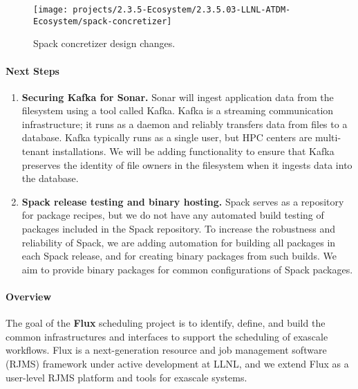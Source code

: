 \begin{figure}[htb]
    \centering
    \texttt{[image: projects/2.3.5-Ecosystem/2.3.5.03-LLNL-ATDM-Ecosystem/spack-concretizer]}
    \caption{\label{fig:concretize}
        Spack concretizer design changes.
    }
\end{figure}


\paragraph{Next Steps}
\begin{enumerate}

    \item {\bf Securing Kafka for Sonar.}  Sonar will ingest application
    data from the filesystem using a tool called Kafka. Kafka is a
    streaming communication infrastructure; it runs as a daemon and
    reliably transfers data from files to a database.  Kafka typically
    runs as a single user, but HPC centers are multi-tenant
    installations.  We will be adding functionality to ensure that Kafka
    preserves the identity of file owners in the filesystem when it
    ingests data into the database.

    \item {\bf Spack release testing and binary hosting.} Spack serves as
    a repository for package recipes, but we do not have any automated
    build testing of packages included in the Spack repository.  To
    increase the robustness and reliability of Spack, we are adding
    automation for building all packages in each Spack release, and for
    creating binary packages from such builds. We aim to provide binary
    packages for common configurations of Spack packages.
\end{enumerate}


\paragraph{Overview}
The goal of the {\bf Flux} scheduling project is to identify, define, and build
the common infrastructures and interfaces to support the scheduling
of exascale workflows. Flux is a next-generation
resource and job management software (RJMS) framework
under active development at LLNL, and we extend
Flux as a user-level RJMS platform and tools for exascale systems.


